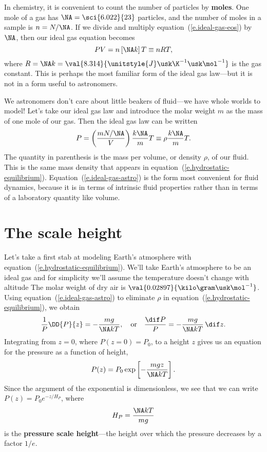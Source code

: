 In chemistry, it is convenient to count the number of particles by \textbf{moles}.  One mole of a gas has $\NA = \sci{6.022}{23}$ particles, and the number of moles in a sample is $n = N/\NA$.  If we divide and multiply equation~(\ref{e.ideal-gas-eos}) by $\NA$, then our ideal gas equation becomes
\[ PV = n\left[\NA k\right]T \equiv n R T, \]
where $R = \NA k = \val{8.314}{\unitstyle{J}\usk\K^{-1}\usk\mol^{-1}}$ is the gas constant. This is perhaps the most familiar form of the ideal gas law---but it is not in a form useful to astronomers.

We astronomers don't care about little beakers of fluid---we have whole worlds to model! Let's take our ideal gas law and introduce the molar weight $m$ as the mass of one mole of our gas.  Then the ideal gas law can be written
\begin{equation}\label{e.ideal-gas-astro}
 P = \left(\frac{mN/\NA}{V}\right)\frac{k\NA}{m} T \equiv \rho \frac{k\NA}{m} T.
\end{equation}
The quantity in parenthesis is the mass per volume, or density $\rho$, of our fluid.  This is the same mass density that appears in equation~(\ref{e.hydrostatic-equilibrium}).  Equation~(\ref{e.ideal-gas-astro}) is the form most convenient for fluid dynamics, because it is in terms of intrinsic fluid properties rather than in terms of a laboratory quantity like volume.

\section{The scale height}\label{s.scale-height}
Let's take a first stab at modeling Earth's atmosphere with equation~(\ref{e.hydrostatic-equilibrium}). We'll take Earth's atmosphere to be an ideal gas and for simplicity we'll assume the temperature doesn't change with altitude  The molar weight of dry air is $\val{0.02897}{\kilo\gram\usk\mol^{-1}}$.  Using equation~(\ref{e.ideal-gas-astro}) to eliminate $\rho$ in equation~(\ref{e.hydrostatic-equilibrium}), we obtain
\[
	\frac{1}{P}\DD{P}{z} = -\frac{mg}{\NA kT},\quad\textrm{or} \quad\frac{\dif P}{P} = -\frac{mg}{\NA kT}\,\dif z.
\]
Integrating from $z=0$, where $P(z=0)=P_{0}$, to a height $z$ gives us an equation for the pressure as a function of height,
\begin{equation}\label{e.exp-atm}
	P(z) = P_{0}\exp\left[-\frac{mgz}{\NA kT}\right].
\end{equation}
Since the argument of the exponential is dimensionless, we see that we can write $P(z) = P_{0}e^{-z/H_{P}}$, where
\[  H_{P} = \frac{\NA kT}{mg} \]
is the \textbf{pressure scale height}---the height over which the pressure decreases by a factor $1/e$.

